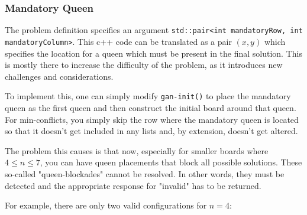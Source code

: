 \documentclass{article}
\begin{document}
\subsubsection{Mandatory Queen}
The problem definition specifies an argument \texttt{std::pair<int mandatoryRow, int mandatoryColumn>}.
This c++ code can be translated as a pair $(x, y)$ which specifies the location for a queen which must be present in the final solution.
This is mostly there to increase the difficulty of the problem, as it introduces new challenges and considerations.

To implement this, one can simply modify \texttt{gan-init()} to place the mandatory queen as the first queen and then construct the initial board around that queen.
For min-conflicts, you simply skip the row where the mandatory queen is located so that it doesn't get included in any lists and, by extension, doesn't get altered.

The problem this causes is that now, especially for smaller boards where \(4 \leq n \leq 7\),
you can have queen placements that block all possible solutions. These so-called "queen-blockades" cannot be resolved.
In other words, they must be detected and the appropriate response for "invalid" has to be returned.

For example, there are only two valid configurations for \(n = 4\):
\end{document}
